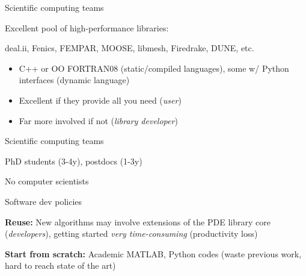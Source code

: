 %
%
%
%
%
%


\begin{frame}{Scientific computing teams}

Excellent pool of high-performance libraries:

deal.ii, Fenics, FEMPAR, MOOSE, libmesh, Firedrake, DUNE, etc.

\begin{itemize}

  \item  C++ or OO FORTRAN08 (static/compiled languages), some w/ Python interfaces (dynamic language)

  \item Excellent if they provide all you need (\emph{user})

  \item  Far more involved if not (\emph{library developer})

\end{itemize}

\end{frame}

\begin{frame}{Scientific computing teams}

PhD students (3-4y), postdocs (1-3y)

No computer scientists

\begin{block}{Software dev policies}

  \textbf{Reuse:} New algorithms may involve extensions of the PDE library core (\emph{developers}), getting started \emph{very time-consuming} (productivity loss)

  \textbf{Start from scratch:} Academic MATLAB, Python codes (waste previous work, hard to reach state of the art)

\end{block}

\end{frame}

